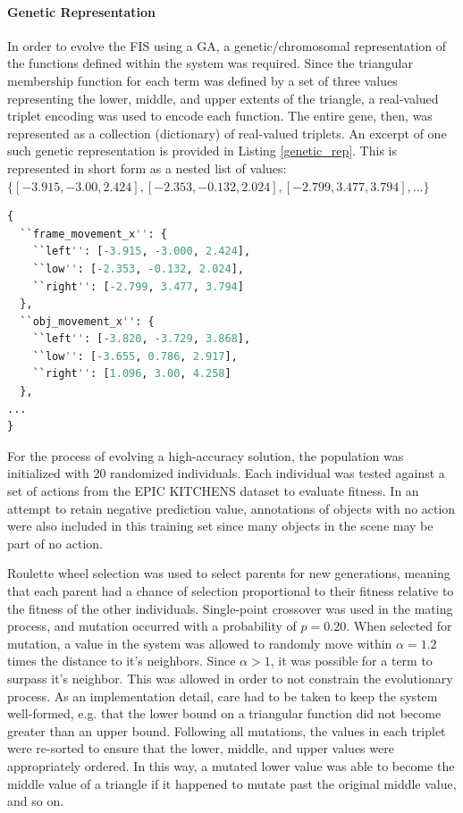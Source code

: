 \documentclass[12pt]{report}
\begin{document}
\paragraph{Genetic Representation}
In order to evolve the FIS using a GA, a genetic/chromosomal representation of the functions defined within the system was required. Since the triangular membership function for each term was defined by a set of three values representing the lower, middle, and upper extents of the triangle, a real-valued triplet encoding was used to encode each function. The entire gene, then, was represented as a collection (dictionary) of real-valued triplets. An excerpt of one such genetic representation is provided in Listing \ref{genetic_rep}. This is represented in short form as a nested list of values: $\{[-3.915, -3.00, 2.424], [-2.353, -0.132, 2.024], [-2.799, 3.477, 3.794], ...\}$

\begin{lstlisting}[language=Python, basicstyle=\small, columns=flexible, frame=single, label=genetic_rep, caption=Example JSON for Genetic Representation]
{
  ``frame_movement_x'': {
    ``left'': [-3.915, -3.000, 2.424], 
    ``low'': [-2.353, -0.132, 2.024], 
    ``right'': [-2.799, 3.477, 3.794]
  }, 
  ``obj_movement_x'': {
    ``left'': [-3.820, -3.729, 3.868], 
    ``low'': [-3.655, 0.786, 2.917], 
    ``right'': [1.096, 3.00, 4.258]
  },
...
}
\end{lstlisting}

For the process of evolving a high-accuracy solution, the population was initialized with 20 randomized individuals. Each individual was tested against a set of actions from the EPIC KITCHENS dataset to evaluate fitness. In an attempt to retain negative prediction value, annotations of objects with no action were also included in this training set since many objects in the scene may be part of no action.

Roulette wheel selection was used to select parents for new generations, meaning that each parent had a chance of selection proportional to their fitness relative to the fitness of the other individuals. Single-point crossover was used in the mating process, and mutation occurred with a probability of $p=0.20$. When selected for mutation, a value in the system was allowed to randomly move within $\alpha=1.2$ times the distance to it's neighbors. Since $\alpha > 1$, it was possible for a term to surpass it's neighbor. This was allowed in order to not constrain the evolutionary process. As an implementation detail, care had to be taken to keep the system well-formed, e.g. that the lower bound on a triangular function did not become greater than an upper bound. Following all mutations, the values in each triplet were re-sorted to ensure that the lower, middle, and upper values were appropriately ordered. In this way, a mutated lower value was able to become the middle value of a triangle if it happened to mutate past the original middle value, and so on.
\end{document}
